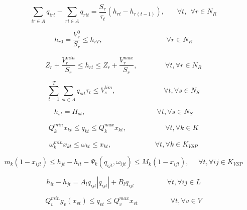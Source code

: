 \documentclass{article}
\begin{document}
\begin{equation}
\sum_{ir \in A} q_{irt} - \sum_{ri \in A}q_{rit} = \frac {S_r}{\tau_t}(h_{rt}-h_{r(t-1)}), ~~~~~~~~ \forall t,~~\forall r \in N_R
\end{equation}

\begin{equation}
h_{r0} = \frac {V_r^0}{S_r} \leq h_{rT}, ~~~~~~~~~~~~~~~~~~~~~~~~~~~~~~~~~~~~~~~~~\forall r \in N_R
\end{equation}

\begin{equation}
Z_r + \frac{V_r^{min}}{S_r} \leq h_{rt} \leq Z_r + \frac{V_r^{max}}{S_r}, ~~~~~~~~~~~~~~~~~~ \forall t, \forall r \in N_R
\end{equation}

\begin{equation}
\sum_{t=1}^T \sum_{si \in A} q_{sit}\tau_t \leq V_s^{lim}, ~~~~~~~~~~~~~~~~~~~~~~~~~~~~~~~ \forall t, \forall s \in N_S
\end{equation}

\begin{equation}
h_{st} = H_{st},   ~~~~~~~~~~~~~~~~~~~~~~~~~~~~~~~~~~~~~~~~~~~~~~\forall t, \forall s \in N_S
\end{equation}

\begin{equation}
Q_k^{min}x_{kt} \leq q_{kt} \leq Q_k^{max}x_{kt},  ~~~~~~~~~~~~~~~~~~~~~~~~~ \forall t, \forall k \in K
\end{equation}

\begin{equation}
\omega_k^{min}x_{kt} \leq \omega_{kt} \leq x_{kt},   ~~~~~~~~~~~~~~~~~~~~~~~~~~~~ \forall t, \forall k \in K_{VSP}
\end{equation}

\begin{equation}
m_k(1-x_{ijt}) \leq h_{jt}-h_{it}-\Psi_k(q_{ijt},\omega_{ijt}) \leq M_k(1-x_{ijt}), ~~~~~~ \forall t, \forall ij \in K_{VSP}
\end{equation}

\begin{equation}
h_{it}-h_{jt} = A_lq_{ijt}\left |q_{ijt}\right |  + B_lq_{ijt} ~~~~~~~~~~~~~~~~~~~~~\forall t, \forall ij \in L
\end{equation}

\begin{equation}
Q_v^{min} g_v(x_{vt}) \leq q_{vt} \leq Q_v^{max}x_{vt}   ~~~~~~~~~~~~~~~~~~~~~\forall t, \forall v \in V
\end{equation}
\end{document}
